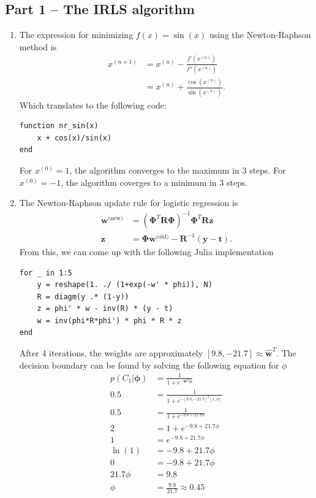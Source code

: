 \documentclass{article}
\begin{document}
\subsection*{Part 1 -- The IRLS algorithm}
\begin{enumerate}
\item
The expression for minimizing $f(x) = \sin(x)$ using the Newton-Raphson method is
\begin{align*}
x^{(n+1)}&=x^{(n)} - \frac{f'(x^{(n)})}{f''(x^{(n)})} \\
&=x^{(n)} + \frac{\cos(x^{(n)})}{\sin(x^{(n)})}.
\end{align*}
Which translates to the following code:
\begin{lstlisting}
function nr_sin(x)
    x + cos(x)/sin(x)
end
\end{lstlisting}
For $x^{(0)}=1$, the algorithm converges to the maximum in 3 steps. For $x^{(0)}=-1$, the algorithm coverges to a minimum in 3 steps.
\item The Newton-Raphson update rule for logistic regression is
\begin{align*}
\bm{w}^{\text{(new)}}&=(\bm{\Phi}^T\bm{R}\bm{\Phi})^{-1}\bm{\Phi}^T\bm{R}\textbf{z} \\
\textbf{z}&=\bm{\Phi}\bm{w}^{\text{(old)}}-\bm{R}^{-1}(\textbf{y} - \textbf{t}).
\end{align*}
From this, we can come up with the following Julia implementation
\begin{lstlisting}
for _ in 1:5
    y = reshape(1. ./ (1+exp(-w' * phi)), N)
    R = diagm(y .* (1-y))
    z = phi' * w - inv(R) * (y - t)
    w = inv(phi*R*phi') * phi * R * z
end
\end{lstlisting}
After 4 iterations, the weights are approximately $[9.8, -21.7]\approx\hat{\bm{w}}^T$.
The decision boundary can be found by solving the following equation for $\phi$
\begin{align*}
p(C_1|\bm{\phi}) &= \frac{1}{1+e^{-\bm{w}^T\bm{\phi}}} \\
0.5 &=  \frac{1}{1+e^{-[9.8, -21.7]^T [1, \phi]}} \\
0.5 &=  \frac{1}{1+e^{-9.8 + 21.7\phi}} \\
2 &=  1+e^{-9.8 + 21.7\phi} \\
1 &=  e^{-9.8 + 21.7\phi} \\
\ln(1) &=  -9.8 + 21.7\phi \\
0 &=  -9.8 + 21.7\phi \\
21.7\phi &=  9.8 \\
\phi &= \frac{9.8}{21.7} \approx 0.45
\end{align*}
\end{enumerate}
\end{document}
